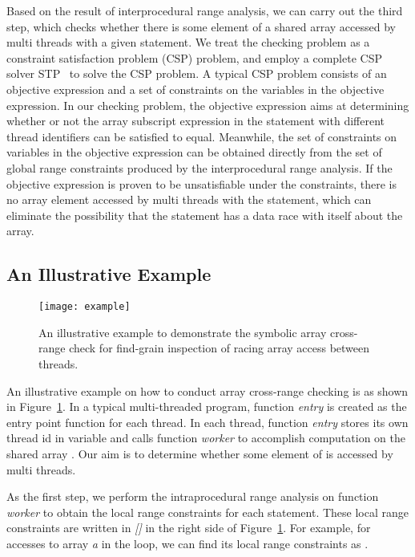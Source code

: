 \documentclass[10pt,onecolumn,letterpaper]{article}
\begin{document}
Based on the result of interprocedural range analysis, we can carry
out the third step, which checks whether there is some element of a
shared array accessed by multi threads with a given statement. We
treat the checking problem as a constraint satisfaction problem
(CSP) problem, and employ a complete CSP solver
STP~\cite{Ganesh07CAV} to solve the CSP problem. A typical CSP
problem consists of an objective expression and a set of constraints
on the variables in the objective expression. In our checking
problem, the objective expression aims at determining whether or not
the array subscript expression in the statement with different
thread identifiers can be satisfied to equal. Meanwhile, the set of
constraints on variables in the objective expression can be obtained
directly from the set of global range constraints produced by the
interprocedural range analysis. If the objective expression is
proven to be unsatisfiable under the constraints, there is no array
element accessed by multi threads with the statement, which can
eliminate the possibility that the statement has a data race with
itself about the array.



\subsection{An Illustrative Example}
\begin{figure}[htbg]
\centering
\texttt{[image: example]}
\caption{An illustrative example to demonstrate the symbolic array
cross-range check for find-grain inspection of racing array access
between threads.}\label{fig:example}
\end{figure}


An illustrative example on how to conduct array cross-range checking
is as shown in Figure~\ref{fig:example}. In a typical multi-threaded
program, function \emph{entry} is created as the entry point
function for each thread. In each thread, function \emph{entry}
stores its own thread id in variable  and calls function
\emph{worker} to accomplish computation on the shared array . Our
aim is to determine whether some element of  is accessed by multi
threads.

As the first step, we perform the intraprocedural range analysis on
function \emph{worker} to obtain the local range constraints for
each statement. These local range constraints are written in
\emph{[]} in the right side of Figure~\ref{fig:example}. For
example, for accesses to array \emph{a} in the loop, we can find its
local range constraints  as .
\end{document}
